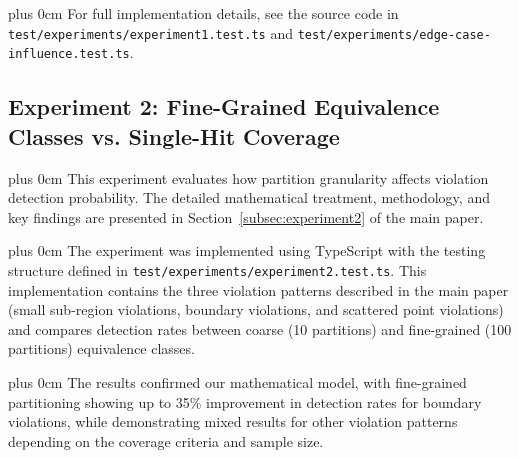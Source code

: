 \documentclass[11pt,a4paper]{article}
\newcommand{\justifytext}{\leftskip=0pt \rightskip=0pt plus 0cm}
\begin{document}
\justifytext
For full implementation details, see the source code in \texttt{test/experiments/experiment1.test.ts} and \texttt{test/experiments/edge-case-influence.test.ts}.

\subsection{Experiment 2: Fine-Grained Equivalence Classes vs. Single-Hit Coverage}

\justifytext
This experiment evaluates how partition granularity affects violation detection probability. The detailed mathematical treatment, methodology, and key findings are presented in Section~\ref{subsec:experiment2} of the main paper. 

\justifytext
The experiment was implemented using TypeScript with the testing structure defined in \texttt{test/experiments/experiment2.test.ts}. This implementation contains the three violation patterns described in the main paper (small sub-region violations, boundary violations, and scattered point violations) and compares detection rates between coarse (10 partitions) and fine-grained (100 partitions) equivalence classes.

\justifytext
The results confirmed our mathematical model, with fine-grained partitioning showing up to 35\% improvement in detection rates for boundary violations, while demonstrating mixed results for other violation patterns depending on the coverage criteria and sample size.
\end{document}
